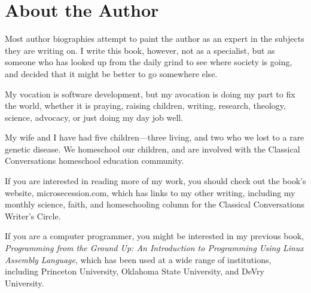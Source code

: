 \chapter*{About the Author}

Most author biographies attempt to paint the author as an expert in 
the subjects they are writing on.  I write this book, however, not
as a specialist, but as someone who has looked up from the daily grind
to see where society is going, and decided that it might be better to 
go somewhere else.  

My vocation is software development, but my avocation is doing my part
to fix the world, whether it is praying, raising children, writing, research,
theology, science, advocacy, or just doing my day job well.

My wife and I have had five children---three living, and two who we lost
to a rare genetic disease.  We homeschool our children, and are involved
with the Classical Conversations homeschool education community.

If you are interested in reading more of my work, you should check out
the book's website, microsecession.com, which has links to my other
writing, including my monthly science, faith, and homeschooling column 
for the Classical Conversations Writer's Circle.

If you are a computer
programmer, you might be interested in my previous book,
\textit{Programming from the Ground Up: An Introduction to Programming
Using Linux Assembly Language}, which has been used at a wide range
of institutions, including Princeton University, Oklahoma State University, 
and DeVry University.
